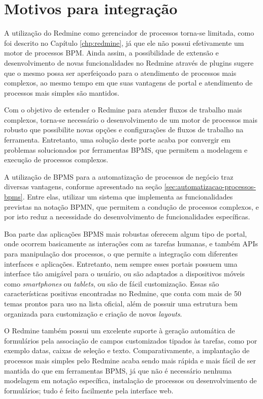 \section{Motivos para integração}\label{sec:cenario-integracao}

A utilização do Redmine como gerenciador de processos torna-se limitada, como foi descrito no Capítulo \ref{chp:redmine}, já que ele não possui efetivamente um motor de processos BPM. Ainda assim, a possibilidade de extensão e desenvolvimento de novas funcionalidades no Redmine através de plugins sugere que o mesmo possa ser aperfeiçoado para o atendimento de processos mais complexos, ao mesmo tempo em que suas vantagens de portal e atendimento de processos mais simples são mantidos.

Com o objetivo de estender o Redmine para atender fluxos de trabalho mais complexos, torna-se necessário o desenvolvimento de um motor de processos mais robusto que possibilite novas opções e configurações de fluxos de trabalho na ferramenta. Entretanto, uma solução deste porte acaba por convergir em problemas solucionados por ferramentas BPMS, que permitem a modelagem e execução de processos complexos.

A utilização de BPMS para a automatização de processos de negócio traz diversas vantagens, conforme apresentado na seção \ref{sec:automatizacao-processos-bpms}. Entre elas, utilizar um sistema que implementa as funcionalidades previstas na notação BPMN, que permitem a condução de processos complexos, e por isto reduz a necessidade do desenvolvimento de funcionalidades específicas. 

Boa parte das aplicações BPMS mais robustas oferecem algum tipo de portal, onde ocorrem basicamente as interações com as tarefas humanas, e também APIs para manipulação dos processos, o que permite a integração com diferentes interfaces e aplicações. Entretanto, nem sempre esses portais possuem uma interface tão amigável para o usuário, ou são adaptados a dispositivos móveis como \textit{smartphones} ou \textit{tablets}, ou são de fácil customização. Essas são características positivas encontradas no Redmine, que conta com mais de 50 temas prontos para uso na lista oficial\cite{redmine_themes}, além de possuir uma estrutura bem organizada para customização e criação de novos \textit{layouts}. 

O Redmine também possui um excelente suporte à geração automática de formulários pela associação de campos customizados tipados às tarefas, como por exemplo datas, caixas de seleção e texto. Comparativamente, a implantação de processos mais simples pelo Redmine acaba sendo mais rápida e mais fácil de ser mantida do que em ferramentas BPMS, já que não é necessário nenhuma modelagem em notação específica, instalação de processos ou desenvolvimento de formulários; tudo é feito facilmente pela interface web. 

